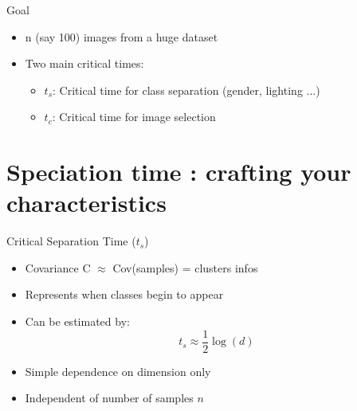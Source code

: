 \documentclass[aspectratio=169]{beamer}
\begin{document}
\begin{frame}{Goal}

    
    \begin{itemize}
        \item n (say 100) images from a huge dataset
        \item Two main critical times:
        \begin{itemize}
            \item $t_s$: Critical time for class separation (gender, lighting ...)
            \item $t_c$: Critical time for image selection
        \end{itemize}
    \end{itemize}
\end{frame}











\section{Speciation time : crafting your characteristics}

\begin{frame}{Critical Separation Time ($t_s$)}
    \begin{itemize}
        \item Covariance C $\approx$ Cov(samples) = clusters infos
        \item Represents when classes begin to appear
        \item Can be estimated by:
        \begin{equation}
            t_s \approx \frac{1}{2}\log(d)
        \end{equation}
        \item Simple dependence on dimension only
        \item Independent of number of samples $n$
    \end{itemize}
    
    \begin{center}
    \end{center}
\end{frame}
\end{document}
